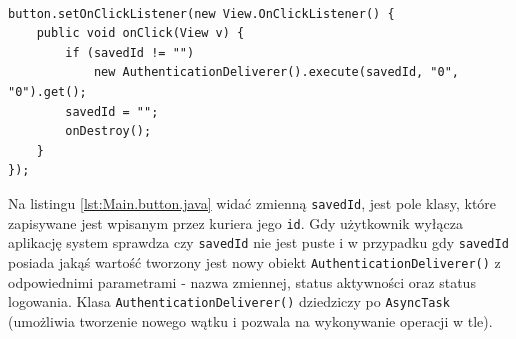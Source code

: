 \documentclass[eng,printmode,oneside]{mgr}
\begin{document}
\begin{lstlisting}[caption=Ustawienie właściwości przycisku
``Off'' w głównej klasie aplikacji mobilnej w
metodzie onCreate(),label=lst:Main.button.java] 

button.setOnClickListener(new View.OnClickListener() { 
	public void onClick(View v) { 
		if (savedId != "")
			new AuthenticationDeliverer().execute(savedId, "0", "0").get();
		savedId = "";
		onDestroy();
	}
});
\end{lstlisting}

Na listingu \ref{lst:Main.button.java} widać zmienną \texttt{savedId},
jest pole klasy, które zapisywane jest wpisanym przez kuriera jego \texttt{id}. Gdy użytkownik wyłącza
aplikację system sprawdza czy \texttt{savedId} nie jest puste i w przypadku gdy
\texttt{savedId} posiada jakąś wartość tworzony jest nowy obiekt
\texttt{AuthenticationDeliverer()} z odpowiednimi parametrami - nazwa
zmiennej, status aktywności oraz status logowania. Klasa
\texttt{AuthenticationDeliverer()} dziedziczy po \texttt{AsyncTask} (umożliwia
tworzenie nowego wątku i pozwala na wykonywanie operacji w tle). 
\end{document}
